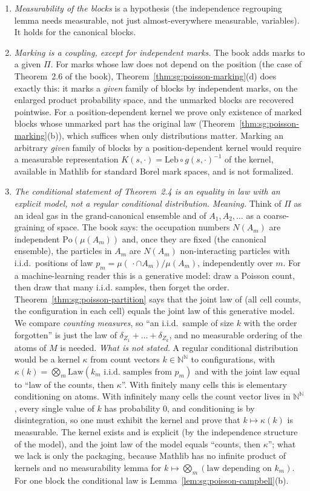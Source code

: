 \begin{remark}
\begin{enumerate}
\item \emph{Measurability of the blocks} is a hypothesis (the independence regrouping lemma needs measurable, not just almost-everywhere measurable, variables). It holds for the canonical blocks.
\item \emph{Marking is a coupling, except for independent marks.} The book adds marks to a given $\Pi$. For marks whose law does not depend on the position (the case of Theorem~2.6 of the book), Theorem~\ref{thm:sg:poisson-marking}(d) does exactly this: it marks a \emph{given} family of blocks by independent marks, on the enlarged product probability space, and the unmarked blocks are recovered pointwise. For a position-dependent kernel we prove only existence of marked blocks whose unmarked part has the original law (Theorem~\ref{thm:sg:poisson-marking}(b)), which suffices when only distributions matter. Marking an arbitrary \emph{given} family of blocks by a position-dependent kernel would require a measurable representation $K(s,\cdot)=\mathrm{Leb}\circ g(s,\cdot)^{-1}$ of the kernel, available in Mathlib for standard Borel mark spaces, and is not formalized.
\item \emph{The conditional statement of Theorem~2.4 is an equality in law with an explicit model, not a regular conditional distribution.}
\emph{Meaning.} Think of $\Pi$ as an ideal gas in the grand-canonical ensemble and of $A_1,A_2,\dots$ as a coarse-graining of space. The book says: the occupation numbers $N(A_m)$ are independent $\mathrm{Po}(\mu(A_m))$ and, once they are fixed (the canonical ensemble), the particles in $A_m$ are $N(A_m)$ non-interacting particles with i.i.d.\ positions of law $p_m=\mu(\,\cdot\cap A_m)/\mu(A_m)$, independently over $m$. For a machine-learning reader this is a generative model: draw a Poisson count, then draw that many i.i.d. samples, then forget the order. Theorem~\ref{thm:sg:poisson-partition} says that the joint law of (all cell counts, the configuration in each cell) equals the joint law of this generative model. We compare \emph{counting measures}, so ``an i.i.d.\ sample of size $k$ with the order forgotten'' is just the law of $\delta_{Z_1}+\dots+\delta_{Z_k}$, and no measurable ordering of the atoms of $M$ is needed.
\emph{What is not stated.} A regular conditional distribution would be a kernel $\kappa$ from count vectors $k\in\mathbb N^{\mathbb N}$ to configurations, with $\kappa(k)=\bigotimes_m\mathrm{Law}(k_m\text{ i.i.d.\ samples from }p_m)$ and with the joint law equal to ``law of the counts, then $\kappa$''. With finitely many cells this is elementary conditioning on atoms. With infinitely many cells the count vector lives in $\mathbb N^{\mathbb N}$, every single value of $k$ has probability $0$, and conditioning is by disintegration, so one must exhibit the kernel and prove that $k\mapsto\kappa(k)$ is measurable. The kernel exists and is explicit (by the independence structure of the model), and the joint law of the model equals ``counts, then $\kappa$''; what we lack is only the packaging, because Mathlib has no infinite product of kernels and no measurability lemma for $k\mapsto\bigotimes_m(\text{law depending on }k_m)$. For one block the conditional law is Lemma~\ref{lem:sg:poisson-campbell}(b).

\end{enumerate}
\end{remark}
